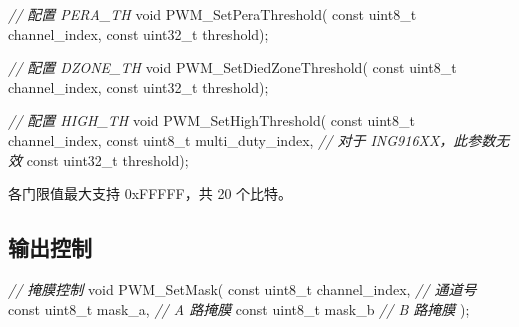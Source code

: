 \documentclass[
  12pt,
]{book}
\newenvironment{Shaded}{\begin{snugshade}}{\end{snugshade}}
\newcommand{\CommentTok}[1]{\textcolor[rgb]{0.56,0.35,0.01}{\textit{#1}}}
\newcommand{\DataTypeTok}[1]{\textcolor[rgb]{0.13,0.29,0.53}{#1}}
\newcommand{\NormalTok}[1]{#1}
\begin{document}
\begin{Shaded}
\begin{Highlighting}[]
\CommentTok{// 配置 PERA_TH}
\DataTypeTok{void}\NormalTok{ PWM_SetPeraThreshold(}
    \DataTypeTok{const} \DataTypeTok{uint8_t}\NormalTok{ channel_index,}
    \DataTypeTok{const} \DataTypeTok{uint32_t}\NormalTok{ threshold);}
\end{Highlighting}
\end{Shaded}

\begin{Shaded}
\begin{Highlighting}[]
\CommentTok{// 配置 DZONE_TH}
\DataTypeTok{void}\NormalTok{ PWM_SetDiedZoneThreshold(}
    \DataTypeTok{const} \DataTypeTok{uint8_t}\NormalTok{ channel_index,}
    \DataTypeTok{const} \DataTypeTok{uint32_t}\NormalTok{ threshold);}
\end{Highlighting}
\end{Shaded}

\begin{Shaded}
\begin{Highlighting}[]
\CommentTok{// 配置 HIGH_TH}
\DataTypeTok{void}\NormalTok{ PWM_SetHighThreshold(}
    \DataTypeTok{const} \DataTypeTok{uint8_t}\NormalTok{ channel_index,}
    \DataTypeTok{const} \DataTypeTok{uint8_t}\NormalTok{ multi_duty_index, }\CommentTok{// 对于 ING916XX，此参数无效}
    \DataTypeTok{const} \DataTypeTok{uint32_t}\NormalTok{ threshold);}
\end{Highlighting}
\end{Shaded}

各门限值最大支持 0xFFFFF，共 20 个比特。

\hypertarget{ux8f93ux51faux63a7ux5236-1}{%
\subsection{输出控制}\label{ux8f93ux51faux63a7ux5236-1}}

\begin{Shaded}
\begin{Highlighting}[]
\CommentTok{// 掩膜控制}
\DataTypeTok{void}\NormalTok{ PWM_SetMask(}
    \DataTypeTok{const} \DataTypeTok{uint8_t}\NormalTok{ channel_index,    }\CommentTok{// 通道号}
    \DataTypeTok{const} \DataTypeTok{uint8_t}\NormalTok{ mask_a,           }\CommentTok{// A 路掩膜}
    \DataTypeTok{const} \DataTypeTok{uint8_t}\NormalTok{ mask_b            }\CommentTok{// B 路掩膜}
\NormalTok{    );}
\end{Highlighting}
\end{Shaded}
\end{document}
